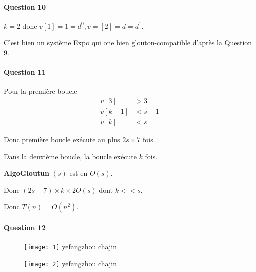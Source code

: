 \documentclass{article}
\begin{document}
\paragraph{Question 10}
$k=2$ donc $v[1]=1=d^0, v =[2]=d=d^1$.

C'est bien un système Expo qui one bien glouton-compatible d'après la Question 9.
\paragraph{Question 11}
Pour la première boucle 
\begin{align*}
v[3] &>3\\v[k-1] &< s-1\\v[k] &<s
\end{align*}

Donc première boucle exécute au plus $2s \times 7$ fois.

Dans la deuxième boucle, la boucle exécute $k$ fois.

\textbf{AlgoGloutun} $(s)$ est en $O(s)$.

Donc $(2s-7) \times k \times 2O(s)$ dont $k <<s$.

Donc $T(n) = O(n^2)$.
\paragraph{Question 12}

\begin{figure}[!b]
   \center\texttt{[image: 1]}
   \center yefangzhou chajin
\end{figure}
\newpage
\begin{figure}[!h]
 \center\texttt{[image: 2]}
   \center yefangzhou chajin
\end{figure}
\end{document}
